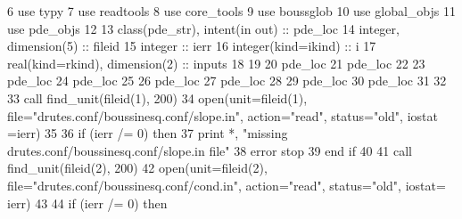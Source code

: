 \begin{DoxyCode}
6       \textcolor{keywordtype}{use }typy
7       \textcolor{keywordtype}{use }readtools
8       \textcolor{keywordtype}{use }core_tools
9       \textcolor{keywordtype}{use }boussglob
10       \textcolor{keywordtype}{use }global_objs
11       \textcolor{keywordtype}{use }pde_objs
12       
13       \textcolor{keywordtype}{class}(pde_str), \textcolor{keywordtype}{intent(in out)} :: pde\_loc
14       \textcolor{keywordtype}{integer}, \textcolor{keywordtype}{dimension(5)} :: fileid
15       \textcolor{keywordtype}{integer} :: ierr
16       \textcolor{keywordtype}{integer(kind=ikind)} :: i
17       \textcolor{keywordtype}{real(kind=rkind)}, \textcolor{keywordtype}{dimension(2)} :: inputs
18       
19       
20       pde\_loc%
21       pde\_loc%
22 
23       pde\_loc%
24       pde\_loc%
25 
26       pde\_loc%
27       pde\_loc%
28 
29       pde\_loc%
30       pde\_loc%
31       
32       
33       \textcolor{keyword}{call }find_unit(fileid(1), 200)
34       \textcolor{keyword}{open}(unit=fileid(1), file=\textcolor{stringliteral}{"drutes.conf/boussinesq.conf/slope.in"}, action\textcolor{comment}{=}\textcolor{stringliteral}{"read"}\textcolor{comment}{, status=}\textcolor{stringliteral}{"old"}\textcolor{comment}{, iostat
      =ierr)}
35 \textcolor{comment}{      }
36 \textcolor{comment}{      }\textcolor{keywordflow}{if} (ierr /= 0) \textcolor{keywordflow}{then}
37         print *, \textcolor{stringliteral}{"missing drutes.conf/boussinesq.conf/slope.in file"}
38         error stop
39 \textcolor{keywordflow}{      end if}
40       
41       \textcolor{keyword}{call }find_unit(fileid(2), 200)
42       \textcolor{keyword}{open}(unit=fileid(2), file=\textcolor{stringliteral}{"drutes.conf/boussinesq.conf/cond.in"}, action\textcolor{comment}{=}\textcolor{stringliteral}{"read"}\textcolor{comment}{, status=}\textcolor{stringliteral}{"old"}\textcolor{comment}{, iostat=
      ierr)}
43 \textcolor{comment}{      }
44 \textcolor{comment}{      }\textcolor{keywordflow}{if} (ierr /= 0) \textcolor{keywordflow}{then}

\end{DoxyCode}
